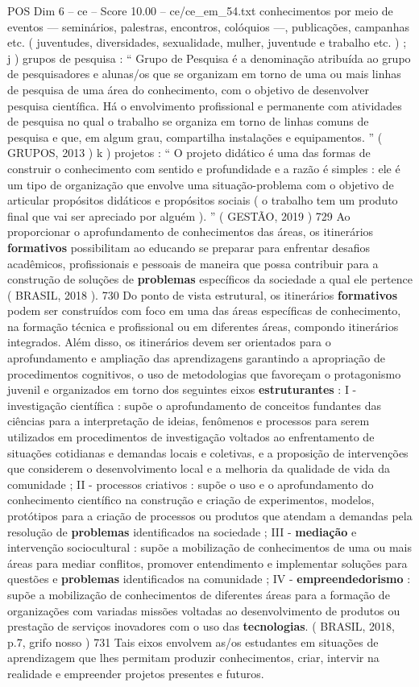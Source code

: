 \begin{textsample}{POS Dim 6 – ce – Score 10.00 – ce/ce\_em\_54.txt}
conhecimentos por meio de eventos — seminários, palestras, encontros, colóquios —, publicações, campanhas etc. ( juventudes, diversidades, sexualidade, mulher, juventude e trabalho etc. ) ; j ) grupos de pesquisa : “ Grupo de Pesquisa é a denominação atribuída ao grupo de pesquisadores e alunas/os que se organizam em torno de uma ou mais linhas de pesquisa de uma área do conhecimento, com o objetivo de desenvolver pesquisa científica.
Há o envolvimento profissional e permanente com atividades de pesquisa no qual o trabalho se organiza em torno de linhas comuns de pesquisa e que, em algum grau, compartilha instalações e equipamentos. ” ( GRUPOS, 2013 ) k ) projetos : “ O projeto didático é uma das formas de construir o conhecimento com sentido e profundidade e a razão é simples : ele é um tipo de organização que envolve uma situação-problema com o objetivo de articular propósitos didáticos e propósitos sociais ( o trabalho tem um produto final que vai ser apreciado por alguém ). ” ( GESTÃO, 2019 ) 729 Ao proporcionar o aprofundamento de conhecimentos das áreas, os itinerários \textbf{formativos} possibilitam ao educando se preparar para enfrentar desafios acadêmicos, profissionais e pessoais de maneira que possa contribuir para a construção de soluções de \textbf{problemas} específicos da sociedade a qual ele pertence ( BRASIL, 2018 ). 730 Do ponto de vista estrutural, os itinerários \textbf{formativos} podem ser construídos com foco em uma das áreas específicas de conhecimento, na formação técnica e profissional ou em diferentes áreas, compondo itinerários integrados.
Além disso, os itinerários devem ser orientados para o aprofundamento e ampliação das aprendizagens garantindo a apropriação de procedimentos cognitivos, o uso de metodologias que favoreçam o protagonismo juvenil e organizados em torno dos seguintes eixos \textbf{estruturantes} : I - investigação científica : supõe o aprofundamento de conceitos fundantes das ciências para a interpretação de ideias, fenômenos e processos para serem utilizados em procedimentos de investigação voltados ao enfrentamento de situações cotidianas e demandas locais e coletivas, e a proposição de intervenções que considerem o desenvolvimento local e a melhoria da qualidade de vida da comunidade ; II - processos criativos : supõe o uso e o aprofundamento do conhecimento científico na construção e criação de experimentos, modelos, protótipos para a criação de processos ou produtos que atendam a demandas pela resolução de \textbf{problemas} identificados na sociedade ; III - \textbf{mediação} e intervenção sociocultural : supõe a mobilização de conhecimentos de uma ou mais áreas para mediar conflitos, promover entendimento e implementar soluções para questões e \textbf{problemas} identificados na comunidade ; IV - \textbf{empreendedorismo} : supõe a mobilização de conhecimentos de diferentes áreas para a formação de organizações com variadas missões voltadas ao desenvolvimento de produtos ou prestação de serviços inovadores com o uso das \textbf{tecnologias}. ( BRASIL, 2018, p.7, grifo nosso ) 731 Tais eixos envolvem as/os estudantes em situações de aprendizagem que lhes permitam produzir conhecimentos, criar, intervir na realidade e empreender projetos presentes e futuros.

\end{textsample}
